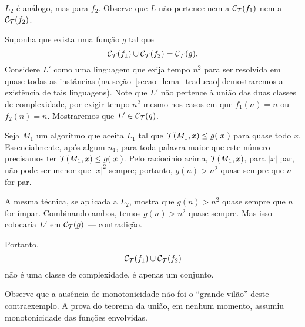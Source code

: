 \begin{counterexample}
    $L_2$ é análogo, mas para $f_2$.
    Observe que $L$ não pertence nem a $\mathcal C_{\mathcal{T}}(f_1)$
    nem a $\mathcal C_{\mathcal{T}}(f_2)$.

    Suponha que exista uma função $g$ tal que
    \begin{equation*}
        \mathcal C_{\mathcal{T}}(f_1) \cup \mathcal C_{\mathcal{T}}(f_2) =
        \mathcal C_{\mathcal{T}}(g).
    \end{equation*}
    Considere $L'$ como uma linguagem que exija tempo $n^2$
    para ser resolvida em quase todas as instâncias
    (na seção~\ref{secao_lema_traducao}
    demostraremos a existência de tais linguagens).
    Note que $L'$ não pertence à união das duas classes de complexidade,
    por exigir tempo $n^2$ mesmo nos casos em que
    $f_1(n) = n$ ou $f_2(n) = n$.
    Mostraremos que $L' \in \mathcal C_{\mathcal{T}}(g)$.

    Seja $M_1$ um algoritmo que aceita $L_1$
    tal que ${\mathcal{T}}(M_1, x) \leq g(|x|)$
    para quase todo $x$.
    Essencialmente,
    após algum $n_1$,
    para toda palavra maior que este número
    precisamos ter ${\mathcal{T}}(M_1, x) \leq g(|x|)$.
    Pelo raciocínio acima,
    ${\mathcal{T}}(M_1, x)$,
    para $|x|$ par,
    não pode ser menor que $|x|^2$ sempre;
    portanto, $g(n) > n^2$ quase sempre
    que $n$ for par.

    A mesma técnica,
    se aplicada a $L_2$,
    mostra que
    $g(n) > n^2$ quase sempre que $n$ for ímpar.
    Combinando ambos,
    temos $g(n) > n^2$ quase sempre.
    Mas isso colocaria $L'$ em $\mathcal C_{\mathcal{T}}(g)$
    --- contradição.

    Portanto,
    \begin{equation*}
        \mathcal C_{\mathcal{T}}(f_1) \cup \mathcal C_{\mathcal{T}}(f_2)
    \end{equation*}
    não é uma classe de complexidade,
    é apenas um conjunto.
\end{counterexample}

Observe que a ausência de monotonicidade
não foi o ``grande vilão''
deste contraexemplo.
A prova do teorema da união,
em nenhum momento,
assumiu monotonicidade das funções envolvidas.
